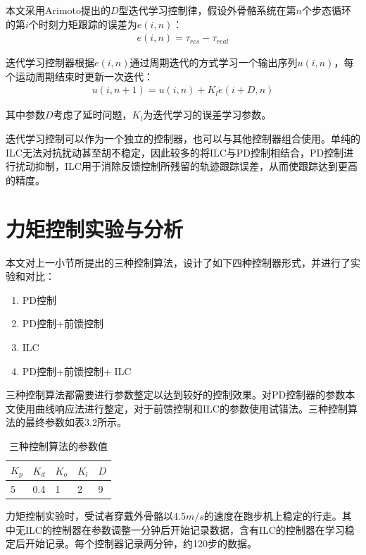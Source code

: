 本文采用Arimoto\cite{p47}提出的$D$型迭代学习控制律，假设外骨骼系统在第$n$个步态循环的第$i$个时刻力矩跟踪的误差为$e(i,n)$：
\begin{align}
    e(i,n) = \tau_{res} - \tau_{real}
\end{align}

迭代学习控制器根据$e(i,n)$通过周期迭代的方式学习一个输出序列$u(i,n)$，每个运动周期结束时更新一次迭代：
\begin{align}
    u(i,n+1) = u(i,n) + K_l\dot{e}(i+D,n)
\end{align}

其中参数$D$考虑了延时问题，$K_l$为迭代学习的误差学习参数。

迭代学习控制可以作为一个独立的控制器，也可以与其他控制器组合使用。单纯的ILC无法对抗扰动甚至胡不稳定，因此较多的将ILC与PD控制相结合，PD控制进行扰动抑制，ILC用于消除反馈控制所残留的轨迹跟踪误差，从而使跟踪达到更高的精度。

\section{力矩控制实验与分析}

本文对上一小节所提出的三种控制算法，设计了如下四种控制器形式，并进行了实验和对比：
\begin{enumerate}
    \item PD控制
    \item PD控制+前馈控制
    \item ILC
    \item PD控制+前馈控制+ ILC
\end{enumerate}

三种控制算法都需要进行参数整定以达到较好的控制效果。对PD控制器的参数本文使用曲线响应法进行整定，对于前馈控制和ILC的参数使用试错法。三种控制算法的最终参数如表3.2所示。

\begin{table}[htb]
    \caption[控制参数]{三种控制算法的参数值}
    \begin{tabular}{lllll}
      \toprule
        $K_p$ & $K_d$ & $K_o$ & $K_l$ & $D$ \\
      \midrule
        5 & 0.4 & 1 & 2 & 9 \\
      \bottomrule
    \end{tabular}
\end{table}

力矩控制实验时，受试者穿戴外骨骼以4.5$m/s$的速度在跑步机上稳定的行走。其中无ILC的控制器在参数调整一分钟后开始记录数据，含有ILC的控制器在学习稳定后开始记录。每个控制器记录两分钟，约120步的数据。

